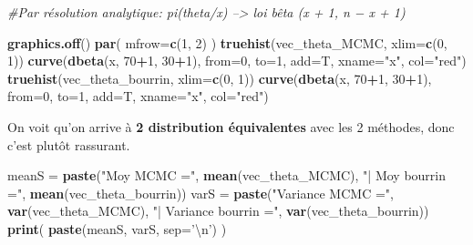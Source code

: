 \documentclass[]{article}
\newenvironment{Shaded}{\begin{snugshade}}{\end{snugshade}}
\newcommand{\CharTok}[1]{\textcolor[rgb]{0.31,0.60,0.02}{#1}}
\newcommand{\CommentTok}[1]{\textcolor[rgb]{0.56,0.35,0.01}{\textit{#1}}}
\newcommand{\DataTypeTok}[1]{\textcolor[rgb]{0.13,0.29,0.53}{#1}}
\newcommand{\DecValTok}[1]{\textcolor[rgb]{0.00,0.00,0.81}{#1}}
\newcommand{\KeywordTok}[1]{\textcolor[rgb]{0.13,0.29,0.53}{\textbf{#1}}}
\newcommand{\NormalTok}[1]{#1}
\newcommand{\OperatorTok}[1]{\textcolor[rgb]{0.81,0.36,0.00}{\textbf{#1}}}
\newcommand{\StringTok}[1]{\textcolor[rgb]{0.31,0.60,0.02}{#1}}
\begin{document}
\begin{Shaded}
\begin{Highlighting}[]
\CommentTok{#Par résolution analytique: pi(theta/x) --> loi bêta (x + 1, n − x + 1)}

\KeywordTok{graphics.off}\NormalTok{()}
\KeywordTok{par}\NormalTok{( }\DataTypeTok{mfrow=}\KeywordTok{c}\NormalTok{(}\DecValTok{1}\NormalTok{, }\DecValTok{2}\NormalTok{) )}
\KeywordTok{truehist}\NormalTok{(vec_theta_MCMC, }\DataTypeTok{xlim=}\KeywordTok{c}\NormalTok{(}\DecValTok{0}\NormalTok{, }\DecValTok{1}\NormalTok{))}
\KeywordTok{curve}\NormalTok{(}\KeywordTok{dbeta}\NormalTok{(x, }\DecValTok{70}\OperatorTok{+}\DecValTok{1}\NormalTok{, }\DecValTok{30}\OperatorTok{+}\DecValTok{1}\NormalTok{), }\DataTypeTok{from=}\DecValTok{0}\NormalTok{, }\DataTypeTok{to=}\DecValTok{1}\NormalTok{, }\DataTypeTok{add=}\NormalTok{T, }\DataTypeTok{xname=}\StringTok{"x"}\NormalTok{, }\DataTypeTok{col=}\StringTok{"red"}\NormalTok{)}
\KeywordTok{truehist}\NormalTok{(vec_theta_bourrin, }\DataTypeTok{xlim=}\KeywordTok{c}\NormalTok{(}\DecValTok{0}\NormalTok{, }\DecValTok{1}\NormalTok{))}
\KeywordTok{curve}\NormalTok{(}\KeywordTok{dbeta}\NormalTok{(x, }\DecValTok{70}\OperatorTok{+}\DecValTok{1}\NormalTok{, }\DecValTok{30}\OperatorTok{+}\DecValTok{1}\NormalTok{), }\DataTypeTok{from=}\DecValTok{0}\NormalTok{, }\DataTypeTok{to=}\DecValTok{1}\NormalTok{, }\DataTypeTok{add=}\NormalTok{T, }\DataTypeTok{xname=}\StringTok{"x"}\NormalTok{, }\DataTypeTok{col=}\StringTok{"red"}\NormalTok{)}
\end{Highlighting}
\end{Shaded}

On voit qu'on arrive à \textbf{2 distribution équivalentes} avec les 2
méthodes, donc c'est plutôt rassurant.

\begin{Shaded}
\begin{Highlighting}[]
\NormalTok{meanS =}\StringTok{ }\KeywordTok{paste}\NormalTok{(}\StringTok{"Moy MCMC ="}\NormalTok{, }\KeywordTok{mean}\NormalTok{(vec_theta_MCMC), }
              \StringTok{"| Moy bourrin ="}\NormalTok{, }\KeywordTok{mean}\NormalTok{(vec_theta_bourrin))}
\NormalTok{varS =}\StringTok{ }\KeywordTok{paste}\NormalTok{(}\StringTok{"Variance MCMC ="}\NormalTok{, }\KeywordTok{var}\NormalTok{(vec_theta_MCMC), }
              \StringTok{"| Variance bourrin ="}\NormalTok{, }\KeywordTok{var}\NormalTok{(vec_theta_bourrin))}
\KeywordTok{print}\NormalTok{( }\KeywordTok{paste}\NormalTok{(meanS, varS, }\DataTypeTok{sep=}\StringTok{'}\CharTok{\textbackslash{}n}\StringTok{'}\NormalTok{) )}
\end{Highlighting}
\end{Shaded}
\end{document}
